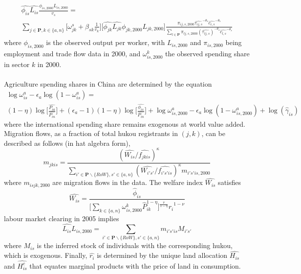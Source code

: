 \documentclass[]{article}
\theoremstyle{plain}
\begin{document}
\begin{equation}
\begin{aligned}
	\hat{\phi_{is}}\hat{L_{is}}\frac{\phi_{is, 2000}L_{is, 2000}}{v_{s}} =  \\ 
	\sum_{j \in \mathbf{P}, k \in \{a, n\}}\bigg[\omega^{s}_{jk} + \beta_{s k}\frac{1}{v_{k}}\bigg]\bigg[\hat{\phi_{jk}}\hat{L_{jk}}\phi_{jk, 2000}L_{jk, 2000}\bigg] \frac{\pi_{ij, s, 2000}\hat{\tau_{ij, s}}^{-\theta_{s}}\hat{c_{i, s}}^{-\theta_{s}}}{\sum_{l \in \mathbf{P}}\pi_{lj, s, 2000}(\hat{\tau_{lj,s}})^{-\theta_{s}}\hat{c_{l, s}}^{-\theta_{s}}}
\end{aligned}
\end{equation}
where $\phi_{is, 2000}$ is the observed output per worker, with $L_{is, 2000}$ and $\pi_{is, 2000}$ being employment and trade flow data in 2000, and $\omega^{k}_{is, 2000}$ the observed spending share in sector $k$ in 2000.
\paragraph*{}
Agriculture spending shares in China are determined by the equation 
\begin{equation}
	\begin{aligned}
	\log\omega^{a}_{is} - \epsilon_{a}\log(1-\omega^{a}_{is}) = \\ (1-\eta)\log\bigg[\frac{\hat{P_{ia}}}{\hat{P_{in}}}\bigg] + (\epsilon_{a}-1)(1-\eta)\log\bigg[\frac{\hat{\phi_{is}}}{\hat{P_{in}}}\bigg] + \log\omega^{a}_{is,2000} - \epsilon_{a}\log(1-\omega^{a}_{is,2000}) + \log(\hat{\gamma}_{is})
	\end{aligned}
\end{equation}
where the international spending share remains exogenous at world value added. Migration flows, as a fraction of total hukou registrants in $(j,k)$, can be described as follows (in hat algebra form), 
\begin{equation}
m_{jkis} = \frac{(\hat{W_{is}}/\hat{f_{jkis}})^{\kappa}}{\sum_{i' \in \mathbf{P} \backslash \{RoW\}, s'\in \{a, n\}}(\hat{W_{i's'}}/\hat{f_{i's'is}})^{\kappa}m_{i's'is, 2000}}
\end{equation}
where $m_{isjk,2000}$ are migration flows in the data. The welfare index $\hat{W_{is}}$ satisfies
\begin{equation}\label{welfareindex}
	\hat{W_{is}} = \frac{\hat{\phi}_{is}}{\bigg[\sum_{k \in \{a, n\}}\omega_{is, 2000}^{k}\hat{P}_{ik}^{1-\eta}\bigg]^{\frac{\nu}{1-\eta}}\hat{r_{i}}^{1-\nu}}
\end{equation}
labour market clearing in 2005 implies
\begin{equation}
	\hat{L_{is}}L_{is, 2000} = \sum_{i' \in \mathbf{P} \backslash \{RoW\}, s'\in \{a, n\}}m_{i's'is}M_{i's'}
\end{equation}
where $M_{is}$ is the inferred stock of individuals with the corresponding hukou, which is exogenous. Finally, $\hat{r_{i}}$ is determined by the unique land allocation  $\hat{H_{is}}$ and $\hat{H^{c}_{is}}$ that equates marginal products with the price of land in consumption. 
\end{document}
